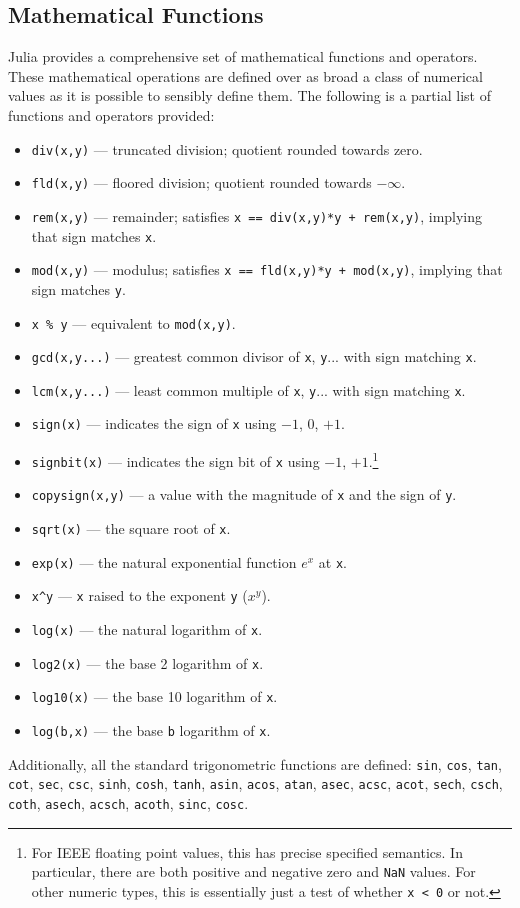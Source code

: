 \documentclass{article}
\begin{document}
\subsection{Mathematical Functions}

Julia provides a comprehensive set of mathematical functions and operators.
These mathematical operations are defined over as broad a class of numerical values as it is possible to sensibly define them.
The following is a partial list of functions and operators provided:
\begin{itemize}
  \item \verb|div(x,y)| --- truncated division; quotient rounded towards zero.
  \item \verb|fld(x,y)| --- floored division; quotient rounded towards $-\infty$.
  \item \verb|rem(x,y)| --- remainder; satisfies \verb|x == div(x,y)*y + rem(x,y)|, implying that sign matches \verb|x|.
  \item \verb|mod(x,y)| --- modulus; satisfies \verb|x == fld(x,y)*y + mod(x,y)|, implying that sign matches \verb|y|.
  \item \verb|x % y| --- equivalent to \verb|mod(x,y)|.
  \item \verb|gcd(x,y...)| --- greatest common divisor of \verb|x|, \verb|y|... with sign matching \verb|x|.
  \item \verb|lcm(x,y...)| --- least common multiple of \verb|x|, \verb|y|... with sign matching \verb|x|.
  \item \verb|sign(x)| --- indicates the sign of \verb|x| using $-1$, $0$, $+1$.
  \item \verb|signbit(x)| --- indicates the sign bit of \verb|x| using $-1$, $+1$.\footnote{For IEEE floating point values, this has precise specified semantics.
  In particular, there are both positive and negative zero and \texttt{NaN} values.
  For other numeric types, this is essentially just a test of whether \texttt{x < 0} or not.}
  \item \verb|copysign(x,y)| --- a value with the magnitude of \verb|x| and the sign of \verb|y|.
  \item \verb|sqrt(x)| --- the square root of \verb|x|.
  \item \verb|exp(x)| --- the natural exponential function $e^x$ at \verb|x|.
  \item \verb|x^y| --- \verb|x| raised to the exponent \verb|y| ($x^y$).
  \item \verb|log(x)| --- the natural logarithm of \verb|x|.
  \item \verb|log2(x)| --- the base 2 logarithm of \verb|x|.
  \item \verb|log10(x)| --- the base 10 logarithm of \verb|x|.
  \item \verb|log(b,x)| --- the base \verb|b| logarithm of \verb|x|.
\end{itemize}
Additionally, all the standard trigonometric functions are defined:
\verb|sin|, \verb|cos|, \verb|tan|, \verb|cot|, \verb|sec|, \verb|csc|, \verb|sinh|, \verb|cosh|, \verb|tanh|, \verb|asin|, \verb|acos|, \verb|atan|, \verb|asec|, \verb|acsc|, \verb|acot|, \verb|sech|, \verb|csch|, \verb|coth|, \verb|asech|, \verb|acsch|, \verb|acoth|, \verb|sinc|, \verb|cosc|.
\end{document}
